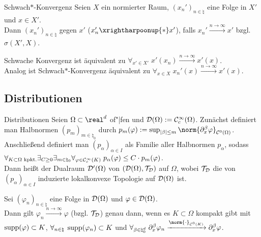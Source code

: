 \begin{Def}{Schwach$\ast$-Konvergenz}
    Seien $X$ ein normierter Raum, $(x_n')_{n \in \natural}$ eine Folge in $X'$ und $x \in X'$.\\
    Dann  $(x_n')_{n \in \natural}$  gegen $x'$
    ($x_n' \xrightharpoonup{\ast} x'$), falls
    $x_n' \xrightarrow{n \to \infty} x'$ bzgl. $\sigma(X', X)$.
\end{Def}

\begin{Bem}
    Schwache Konvergenz ist äquivalent
    zu $\forall_{x' \in X'}\; x'(x_n) \xrightarrow{n \to \infty} x'(x)$.\\
    Analog ist Schwach$\ast$-Konvergenz äquivalent
    zu $\forall_{x \in X}\; x_n'(x) \xrightarrow{n \to \infty} x'(x)$.
\end{Bem}

\subsection{%
    Distributionen%
}

\begin{Def}{Distributionen}
    Seien $\Omega \subset \real^d$ of"|fen und $\mathcal{D}(\Omega) := \mathcal{C}^\infty_c(\Omega)$.
    Zunächst definiert man Halbnormen $(p_m)_{m \in \natural_0}$
    durch $p_m(\varphi) := \sup_{|\beta| \le m} \norm{\partial_x^\beta \varphi}_{\C^0(\Omega)}$.
    Anschließend definiert man $(p_\alpha)_{\alpha \in I}$ als Familie aller Halbnormen
    $p_\alpha$, sodass
    $\forall_{K \subset \Omega \text{ kpkt.}} \exists_{C \ge 0} \exists_{m \in \natural_0}
    \forall_{\varphi \in \mathcal{C}^\infty_c(K)}\; p_\alpha(\varphi) \le C \cdot p_m(\varphi)$.\\
    Dann heißt der Dualraum $\mathcal{D}'(\Omega)$ von $(\mathcal{D}(\Omega), \mathcal{T}_{\mathcal{D}})$
     auf $\Omega$,
    wobei $\mathcal{T}_{\mathcal{D}}$ die von $(p_\alpha)_{\alpha \in I}$ induzierte lokalkonvexe Topologie auf
    $\mathcal{D}(\Omega)$ ist.
\end{Def}

\begin{Bem}
    Sei $(\varphi_n)_{n \in \natural}$ eine Folge in $\mathcal{D}(\Omega)$ und $\varphi \in \mathcal{D}(\Omega)$.\\
    Dann gilt $\varphi_n \xrightarrow{n \to \infty} \varphi$ (bzgl. $\mathcal{T}_{\mathcal{D}}$) genau dann, wenn
    es $K \subset \Omega$ kompakt gibt mit\\
    $\operatorname{supp}(\varphi) \subset K$,
    $\forall_{n \in \natural}\; \operatorname{supp}(\varphi_n) \subset K$ und
    $\forall_{\beta \in \natural_0^d}\; \partial_x^\beta \varphi_n
    \xrightarrow{\norm{\cdot}_{\C^0(K)}} \partial_x^\beta \varphi$.
\end{Bem}

